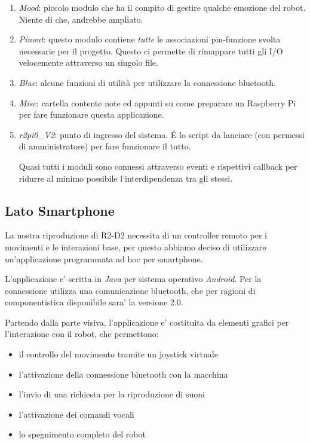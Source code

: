 \documentclass[12pt]{article}
\begin{document}
\begin{enumerate}
Abbiamo quindi scritto questo particolare modulo in C, poi un wrapper per poterlo compilare come modulo Python. Un po' una faticaccia ma il risultato è ottimo!\\
Il modulo C si chiama \emph{proxsensor}, mentre in Python lo abbiamo incapsulato nella classe \emph{SensorController} (del modulo UltrasonicSensor.py) che legge la distanza ad intervalli regolari, scatenando un evento con la nuova distanza a cui si possono collegare tutti i listener del caso (pattern Observer).
\item \emph{Mood}: piccolo modulo che ha il compito di gestire qualche emozione del robot. Niente di che, andrebbe ampliato.
\item \emph{Pinout}: questo modulo contiene \emph{tutte} le associazioni pin-funzione svolta necessarie per il progetto. Questo ci permette di rimappare tutti gli I/O velocemente attraverso un singolo file.
\item \emph{Blue}: alcune funzioni di utilità per utilizzare la connessione bluetooth.
\item \emph{Misc}: cartella contente note ed appunti su come preparare un Raspberry Pi per fare funzionare questa applicazione.
\item \emph{r2pi0\_{}V2}: punto di ingresso del sistema. \'E lo script da lanciare (con permessi di amministratore) per fare funzionare il tutto.

Quasi tutti i moduli sono connessi attraverso eventi e rispettivi callback per ridurre al minimo possibile l'interdipendenza tra gli stessi.
\end{enumerate}

\subsection{Lato Smartphone}

La nostra riproduzione di R2-D2 necessita di un controller remoto per i movimenti e le interazioni base,
per questo abbiamo deciso di utilizzare un'applicazione programmata ad hoc per smartphone.

L'applicazione e' scritta in \emph{Java} per sistema operativo \emph{Android}.
Per la connessione utilizza una comunicazione bluetooth, che per ragioni di componentistica disponibile sara' la versione 2.0.

\medskip

Partendo dalla parte visiva, l'applicazione e' costituita da elementi grafici per l'interazione con il robot, che permettono:
\begin{itemize}
\item il controllo del movimento tramite un joystick virtuale
\item l'attivazione della connessione bluetooth con la macchina
\item l'invio di una richiesta per la riproduzione di suoni
\item l'attivazione dei comandi vocali
\item lo spegnimento completo del robot
\end{itemize}
\end{document}
